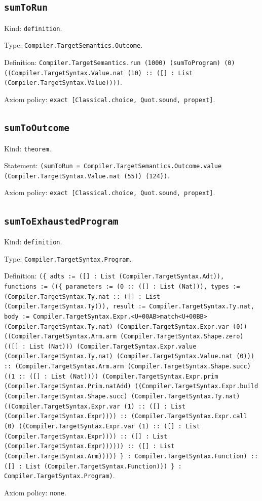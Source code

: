 \documentclass[11pt]{article}
\begin{document}
\subsection*{\texttt{sumToRun}}
\noindent Kind: \texttt{definition}.\par
\noindent Type: \texttt{Compiler.TargetSemantics.Outcome}.\par
\noindent Definition: \texttt{Compiler.TargetSemantics.run (1000) (sumToProgram) (0) ((Compiler.TargetSyntax.Value.nat (10) :: ([] : List (Compiler.TargetSyntax.Value))))}.\par
\noindent Axiom policy: \texttt{exact [Classical.choice, Quot.sound, propext]}.\par
\subsection*{\texttt{sumToOutcome}}
\noindent Kind: \texttt{theorem}.\par
\noindent Statement: \texttt{(sumToRun = Compiler.TargetSemantics.Outcome.value (Compiler.TargetSyntax.Value.nat (55)) (124))}.\par
\noindent Axiom policy: \texttt{exact [Classical.choice, Quot.sound, propext]}.\par
\subsection*{\texttt{sumToExhaustedProgram}}
\noindent Kind: \texttt{definition}.\par
\noindent Type: \texttt{Compiler.TargetSyntax.Program}.\par
\noindent Definition: \texttt{(\{ adts := ([] : List (Compiler.TargetSyntax.Adt)), functions := ((\{ parameters := (0 :: ([] : List (Nat))), types := (Compiler.TargetSyntax.Ty.nat :: ([] : List (Compiler.TargetSyntax.Ty))), result := Compiler.TargetSyntax.Ty.nat, body := Compiler.TargetSyntax.Expr.<U+00AB>match<U+00BB> (Compiler.TargetSyntax.Ty.nat) (Compiler.TargetSyntax.Expr.var (0)) ((Compiler.TargetSyntax.Arm.arm (Compiler.TargetSyntax.Shape.zero) (([] : List (Nat))) (Compiler.TargetSyntax.Expr.value (Compiler.TargetSyntax.Ty.nat) (Compiler.TargetSyntax.Value.nat (0))) :: (Compiler.TargetSyntax.Arm.arm (Compiler.TargetSyntax.Shape.succ) ((1 :: ([] : List (Nat)))) (Compiler.TargetSyntax.Expr.prim (Compiler.TargetSyntax.Prim.natAdd) ((Compiler.TargetSyntax.Expr.build (Compiler.TargetSyntax.Shape.succ) (Compiler.TargetSyntax.Ty.nat) ((Compiler.TargetSyntax.Expr.var (1) :: ([] : List (Compiler.TargetSyntax.Expr)))) :: (Compiler.TargetSyntax.Expr.call (0) ((Compiler.TargetSyntax.Expr.var (1) :: ([] : List (Compiler.TargetSyntax.Expr)))) :: ([] : List (Compiler.TargetSyntax.Expr)))))) :: ([] : List (Compiler.TargetSyntax.Arm))))) \} : Compiler.TargetSyntax.Function) :: ([] : List (Compiler.TargetSyntax.Function))) \} : Compiler.TargetSyntax.Program)}.\par
\noindent Axiom policy: \texttt{none}.\par
\end{document}
